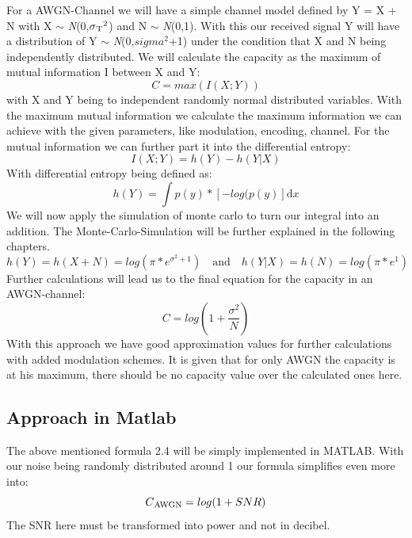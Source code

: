 \documentclass[12pt,oneside, reqno]{report}
\begin{document}
For a AWGN-Channel we will have a simple channel model defined by Y = X + N with X $\sim$ \textit{N}(0,$\sigma\textsubscript{T}^2$) and N $\sim$ \textit{N}(0,1). With this our received signal Y will have a distribution of Y $\sim$ \textit{N}(0,$sigma^2$+1) under the condition that X and N being independently distributed.
We will calculate the capacity as the maximum of mutual information I between X and Y:
\begin{equation}
\label{eq:cap}
C = max(I(X;Y))     
\end{equation}
with X and Y being to independent randomly normal distributed variables.
With the maximum mutual information we calculate the maximum information we can achieve with the given parameters, like modulation, encoding, channel. 
\newline
For the mutual information we can further part it into the differential entropy:
\begin{equation}
I(X;Y) = h(Y) - h(Y|X)
\end{equation}
\newline
With differential entropy being defined as:
\begin{equation}
h(Y) = \int p(y)*[-log(p(y)] \mathrm{d}x
\end{equation}
We will now apply the simulation of monte carlo to turn our integral into an addition. The Monte-Carlo-Simulation will be further explained in the following chapters.
\begin{equation}
h(Y) = h(X+N) = log(\pi*e^{\sigma^2+1}) \quad \textrm{and} \quad h(Y|X) = h(N) = log(\pi*e^{1})
\end{equation}
Further calculations will lead us to the final equation for the capacity in an AWGN-channel:
\begin{equation}
C = log(1+\frac{\sigma^2}{N})
\end{equation}
With this approach we have good approximation values for further calculations with added modulation schemes. It is given that for only AWGN the capacity is at his maximum, there should be no capacity value over the calculated ones here. 

\subsection{Approach in Matlab}
The above mentioned formula 2.4 will be simply implemented in MATLAB. With our noise being randomly distributed around 1 our formula simplifies even more into:
\begin{equation}
\label{eq:AWGN}
C\textsubscript{AWGN} = log(1+SNR) 
\end{equation} 
The SNR here must be transformed into power and not in decibel.
\end{document}
